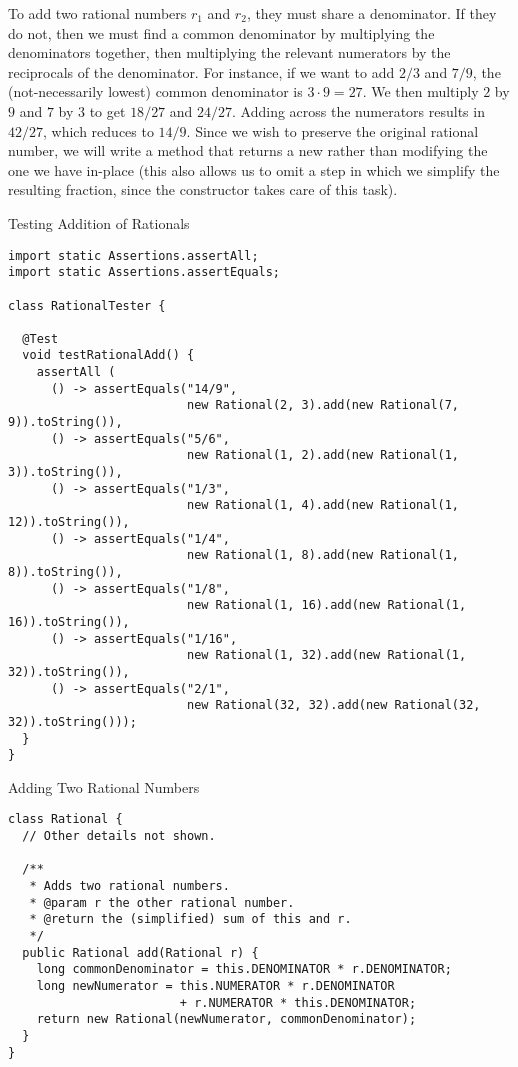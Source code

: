 To add two rational numbers $r_1$ and $r_2$, they must share a denominator. If they do not, then we must find a common denominator by multiplying the denominators together, then multiplying the relevant numerators by the reciprocals of the denominator. For instance, if we want to add $2/3$ and $7/9$, the (not-necessarily lowest) common denominator is $3\cdot{9} = 27$. We then multiply $2$ by $9$ and $7$ by $3$ to get $18/27$ and $24/27$. Adding across the numerators results in $42/27$, which reduces to $14/9$. Since we wish to preserve the original rational number, we will write a method that returns a new  rather than modifying the one we have in-place (this also allows us to omit a step in which we simplify the resulting fraction, since the constructor takes care of this task).

\begin{cl}{Testing Addition of Rationals}
\begin{lstlisting}[language=MyJava]
import static Assertions.assertAll;
import static Assertions.assertEquals;

class RationalTester {

  @Test
  void testRationalAdd() {
    assertAll (
      () -> assertEquals("14/9", 
                         new Rational(2, 3).add(new Rational(7, 9)).toString()),
      () -> assertEquals("5/6", 
                         new Rational(1, 2).add(new Rational(1, 3)).toString()),
      () -> assertEquals("1/3", 
                         new Rational(1, 4).add(new Rational(1, 12)).toString()),
      () -> assertEquals("1/4", 
                         new Rational(1, 8).add(new Rational(1, 8)).toString()),
      () -> assertEquals("1/8", 
                         new Rational(1, 16).add(new Rational(1, 16)).toString()),
      () -> assertEquals("1/16", 
                         new Rational(1, 32).add(new Rational(1, 32)).toString()),
      () -> assertEquals("2/1", 
                         new Rational(32, 32).add(new Rational(32, 32)).toString()));
  }
}
\end{lstlisting}
\end{cl}

\begin{cl}{Adding Two Rational Numbers}
\begin{lstlisting}[language=MyJava]
class Rational {
  // Other details not shown.

  /**
   * Adds two rational numbers.
   * @param r the other rational number.
   * @return the (simplified) sum of this and r.
   */
  public Rational add(Rational r) {
    long commonDenominator = this.DENOMINATOR * r.DENOMINATOR;
    long newNumerator = this.NUMERATOR * r.DENOMINATOR 
                        + r.NUMERATOR * this.DENOMINATOR;
    return new Rational(newNumerator, commonDenominator);
  }
}
\end{lstlisting}
\end{cl}

